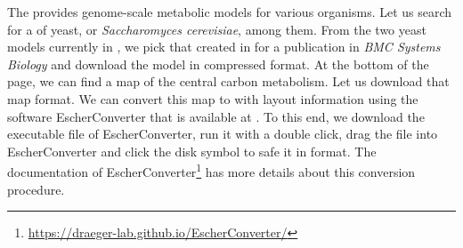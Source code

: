 The \BiGG provides genome-scale metabolic models for various organisms.
Let us search for a \GEM of yeast, or \emph{Saccharomyces cerevisiae}, among them.
From the two yeast models currently in \BiGG, we pick \iMM that \citeauthor{Mo2009} created in \citeyear{Mo2009} for a publication in \emph{BMC Systems Biology} and download the model in compressed \SBML format.
At the bottom of the page, we can find a map of the central carbon metabolism.
Let us download that map \JSON format.
We can convert this map to \SBML with layout information using the software EscherConverter \citep{King2015a} that is available at .
To this end, we download the executable \JAR file of EscherConverter, run it with a double click, drag the \JSON file into EscherConverter and click the disk symbol to safe it in \SBML format.
The documentation of EscherConverter\footnote{\url{https://draeger-lab.github.io/EscherConverter/}} has more details about this conversion procedure.

